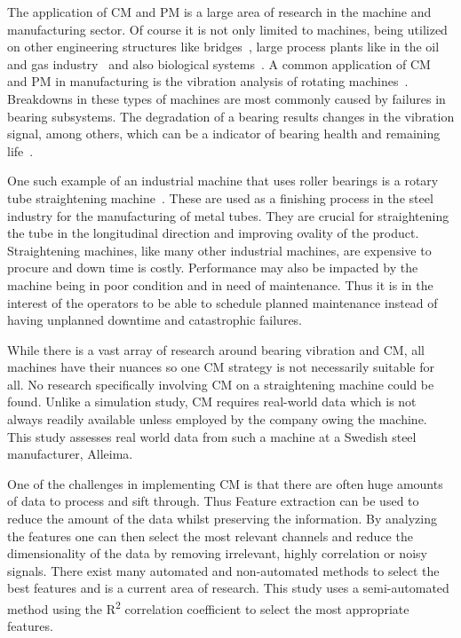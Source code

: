 \documentclass[]{article}
\begin{document}
The application of \gls{CM} and \gls{PM} is a large area of research in the machine and manufacturing sector. Of course it is not only limited to machines, being utilized on other engineering structures like bridges~\cite{buckley2023feature}, large process plants like in the oil and gas industry~\cite{telford2011condition} and also biological systems~\cite{tolocsi2011classification}. 
A common application of \gls{CM} and \gls{PM} in manufacturing is the vibration analysis of rotating machines~\cite{tiboni2022review, kateris2014machine}. Breakdowns in these types of machines are most commonly caused by failures in bearing subsystems. The degradation of a bearing results changes in the vibration signal, among others, which can be a indicator of bearing health and remaining life~\cite{zhang2016degradation}. 

One such example of an industrial machine that uses roller bearings is a rotary tube straightening machine~\cite{kato2014straightening, ma2020effect, ma2021analysis, yu2018theoretical, das1991mechanics, yoshimura2009effect, zhang2019modeling}. These are used as a finishing process in the steel industry for the manufacturing of metal tubes. They are crucial for straightening the tube in the longitudinal direction and improving ovality of the product. 
Straightening machines, like many other industrial machines, are expensive to procure and down time is costly. Performance may also be impacted by the machine being in poor condition and in need of maintenance. Thus it is in the interest of the operators to be able to schedule planned maintenance instead of having unplanned downtime and catastrophic failures.

While there is a vast array of research around bearing vibration and \gls{CM}, all machines have their nuances so one \gls{CM} strategy is not necessarily suitable for all. No research specifically involving \gls{CM} on a straightening machine could be found. Unlike a simulation study, \gls{CM} requires real-world data which is not always readily available unless employed by the company owing the machine. This study assesses real world data from such a machine at a Swedish steel manufacturer, Alleima.

One of the challenges in implementing \gls{CM} is that there are often huge amounts of data to process and sift through. Thus Feature extraction can be used to reduce the amount of the data whilst preserving the information. By analyzing the features one can then select the most relevant channels and reduce the dimensionality of the data by removing irrelevant, highly correlation or noisy signals. There exist many automated and non-automated methods to select the best features and is a current area of research. This study uses a semi-automated method using the R\textsuperscript{2} correlation coefficient to select the most appropriate features.
\end{document}
